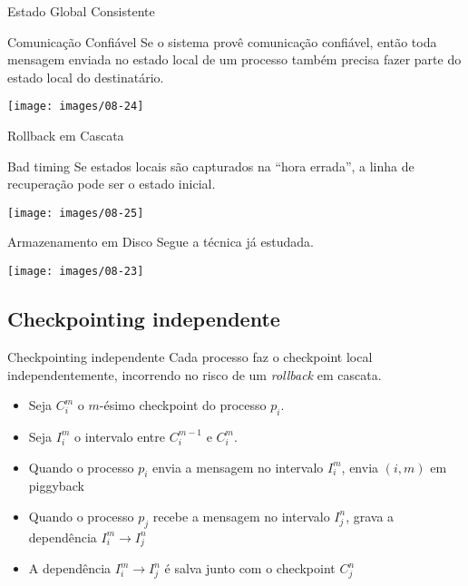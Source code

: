 \begin{frame}{Estado Global Consistente}
\begin{block}{Comunicação Confiável}
Se o sistema provê comunicação confiável, então toda mensagem enviada no estado local de um processo também precisa fazer parte do estado local do destinatário.
\end{block}

\texttt{[image: images/08-24]}
\end{frame}


\begin{frame}{Rollback em Cascata}
\begin{block}{Bad timing}
	Se estados locais são capturados na ``hora errada'', a linha de recuperação pode ser o estado inicial.
\end{block}

\texttt{[image: images/08-25]}
\end{frame}

\begin{frame}{Armazenamento em Disco}
Segue a técnica já estudada.

\texttt{[image: images/08-23]}
\end{frame}

\subsection{Checkpointing independente}

\begin{frame}{Checkpointing independente}
Cada processo faz o checkpoint local independentemente, incorrendo no risco de um \emph{rollback} em cascata.

\begin{itemize}
	\item Seja $C_i^m$ o $m$-ésimo checkpoint do processo $p_i$.
	\item Seja $I_i^m$ o intervalo entre $C_i^{m-1}$ e $C_i^m$.
	\item Quando o processo $p_i$ envia a mensagem no intervalo $I_i^m$, envia $(i,m)$ em piggyback
	\item Quando o processo $p_j$ recebe a mensagem no intervalo $I_j^n$, grava a dependência $I_i^m \rightarrow I_j^n$
	\item A dependência $I_i^m \rightarrow I_j^n$ é salva junto com o checkpoint $C_j^n$
\end{itemize}
\end{frame}


